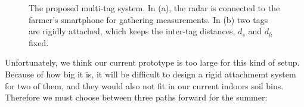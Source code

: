 \documentclass[12pt]{article}
\begin{document}
\begin{figure}
\begin{minipage}[b]{0.55\textwidth}
\end{minipage}%
\caption{The proposed multi-tag system. In (a), the radar is connected
  to the farmer's smartphone for gathering measurements. In (b) two
  tags are rigidly attached, which keeps the inter-tag distances,
  $d_s$ and $d_h$ fixed.}
\label{figure:multiTag}
\end{figure}


Unfortunately, we think our current prototype is too large for this
kind of setup. Because of how big it is, it will be difficult to
design a rigid attachmemt system for two of them, and they would also
not fit in our current indoors soil bins. Therefore we must choose
between three paths forward for the summer:
\end{document}
